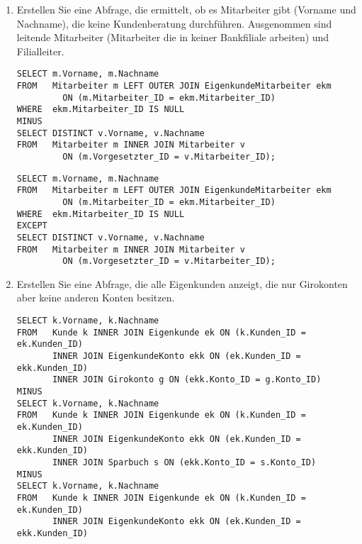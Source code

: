 \begin{enumerate}
\begin{lstlisting}[language=oracle_sql]
        \end{lstlisting}
\clearpage
        \item Erstellen Sie eine Abfrage, die ermittelt, ob es Mitarbeiter gibt
        (Vorname und Nachname), die keine Kundenberatung durchführen.
        Ausgenommen sind leitende Mitarbeiter (Mitarbeiter die in keiner
        Bankfiliale arbeiten) und Filialleiter.
        \begin{oraclesql}[\FALSE]
        \end{oraclesql}
        \begin{lstlisting}[language=oracle_sql]
SELECT m.Vorname, m.Nachname
FROM   Mitarbeiter m LEFT OUTER JOIN EigenkundeMitarbeiter ekm
         ON (m.Mitarbeiter_ID = ekm.Mitarbeiter_ID)
WHERE  ekm.Mitarbeiter_ID IS NULL
MINUS
SELECT DISTINCT v.Vorname, v.Nachname
FROM   Mitarbeiter m INNER JOIN Mitarbeiter v
         ON (m.Vorgesetzter_ID = v.Mitarbeiter_ID);
        \end{lstlisting}
        \begin{mssql}[\FALSE]
        \end{mssql}
        \begin{lstlisting}[language=ms_sql]
SELECT m.Vorname, m.Nachname
FROM   Mitarbeiter m LEFT OUTER JOIN EigenkundeMitarbeiter ekm
         ON (m.Mitarbeiter_ID = ekm.Mitarbeiter_ID)
WHERE  ekm.Mitarbeiter_ID IS NULL
EXCEPT
SELECT DISTINCT v.Vorname, v.Nachname
FROM   Mitarbeiter m INNER JOIN Mitarbeiter v
         ON (m.Vorgesetzter_ID = v.Mitarbeiter_ID);
        \end{lstlisting}
        \item Erstellen Sie eine Abfrage, die alle Eigenkunden anzeigt, die nur
        Girokonten aber keine anderen Konten besitzen.
        \begin{oraclesql}[\FALSE]
        \end{oraclesql}
        \begin{lstlisting}[language=oracle_sql]
SELECT k.Vorname, k.Nachname
FROM   Kunde k INNER JOIN Eigenkunde ek ON (k.Kunden_ID = ek.Kunden_ID)
       INNER JOIN EigenkundeKonto ekk ON (ek.Kunden_ID = ekk.Kunden_ID)
       INNER JOIN Girokonto g ON (ekk.Konto_ID = g.Konto_ID)
MINUS
SELECT k.Vorname, k.Nachname
FROM   Kunde k INNER JOIN Eigenkunde ek ON (k.Kunden_ID = ek.Kunden_ID)
       INNER JOIN EigenkundeKonto ekk ON (ek.Kunden_ID = ekk.Kunden_ID)
       INNER JOIN Sparbuch s ON (ekk.Konto_ID = s.Konto_ID)
MINUS
SELECT k.Vorname, k.Nachname
FROM   Kunde k INNER JOIN Eigenkunde ek ON (k.Kunden_ID = ek.Kunden_ID)
       INNER JOIN EigenkundeKonto ekk ON (ek.Kunden_ID = ekk.Kunden_ID)

\end{lstlisting}
\end{enumerate}
